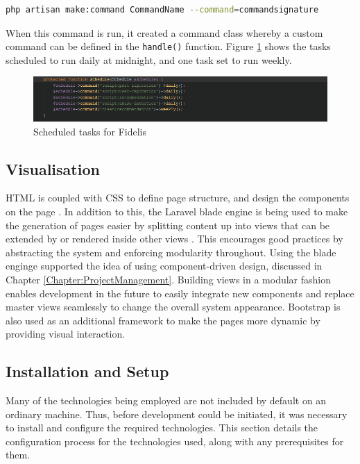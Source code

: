 \begin{lstlisting}[language=bash]
php artisan make:command CommandName --command=commandsignature
\end{lstlisting}

When this command is run, it created a command class whereby a custom command can be defined in the \texttt{handle()} function. Figure \ref{fig:FidelisSchedule} shows the tasks scheduled to run daily at midnight, and one task set to run weekly.

\begin{figure}[H]
\centering
\includegraphics[width=\textwidth]{Images/Implementation/FidelisSchedule}
\caption{Scheduled tasks for Fidelis}
\label{fig:FidelisSchedule}
\end{figure}

\subsection{Visualisation}
HTML is coupled with CSS to define page structure, and design the components on the page \cite{W3:HTML5, W3:CSS}. In addition to this, the Laravel blade engine is being used to make the generation of pages easier by splitting content up into views that can be extended by or rendered inside other views \cite{Laravel:Blade}. This encourages good practices by abstracting the system and enforcing modularity throughout. Using the blade enginge supported the idea of using component-driven design, discussed in Chapter \ref{Chapter:ProjectManagement}. Building views in a modular fashion enables development in the future to easily integrate new components and replace master views seamlessly to change the overall system appearance. Bootstrap is also used as an additional framework to make the pages more dynamic by providing visual interaction.

\subsection{Installation and Setup}
Many of the technologies being employed are not included by default on an ordinary machine. Thus, before development could be initiated, it was necessary to install and configure the required technologies. This section details the configuration process for the technologies used, along with any prerequisites for them.

